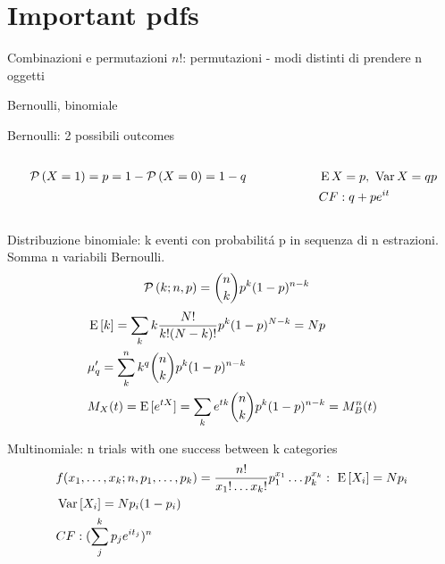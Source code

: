 \section{Important pdfs}

\begin{wordonframe}{Combinazioni e permutazioni}
$n!$: permutazioni - modi distinti di prendere n oggetti
\end{wordonframe}

\begin{frame}{Bernoulli, binomiale}
\begin{block}{Bernoulli: 2 possibili outcomes}
	\begin{columns}[T]
	\begin{column}{0.5\textwidth}
	\begin{align*}
	&\operatorname{\mathcal{P}}{(X=1)}=p=1-\operatorname{\mathcal{P}}{(X=0)}=1-q
	\end{align*}
	\end{column}
	\begin{column}{0.5\textwidth}
	\begin{align*}
	&\operatorname{E}{X}=p,\ \operatorname{Var}{X}=qp\\
	&CF: q+pe^{it}
	\end{align*}
	\end{column}
	\end{columns}
\end{block}
\begin{block}{Distribuzione binomiale: k eventi con probabilit\'a p in sequenza di n estrazioni. Somma n variabili Bernoulli.}
\begin{align*}
&\operatorname{\mathcal{P}}{(k;n,p)}=\binom{n}{k}p^k(1-p)^{n-k}
\end{align*}
\begin{align*}
&\operatorname{E}{[k]}=\sum_kk\frac{N!}{k!(N-k)!}p^k(1-p)^{N-k}=Np\\
&\mu'_q=\sum_k^nk^q\binom{n}{k}p^k(1-p)^{n-k}\\
&M_X(t)=\operatorname{E}{[e^{tX}]}=\sum_ke^{tk}\binom{n}{k}p^k(1-p)^{n-k}=M_B^n(t)
\end{align*}
\end{block}
\end{frame}

\begin{frame}{Multinomiale: n trials with one success between k categories}
	\begin{align*}
	&f(x_1,\ldots,x_k;n,p_1,\ldots,p_k)=\frac{n!}{x_1!\ldots x_k!}p_1^{x_1}\ldots p_k^{x_k}:\ \operatorname{E}{[X_i]}=Np_i\\
	&\operatorname{Var}{[X_i]}=Np_i(1-p_i)\\
	&CF: (\sum_j^kp_je^{it_j})^n
	\end{align*}
\end{frame}

